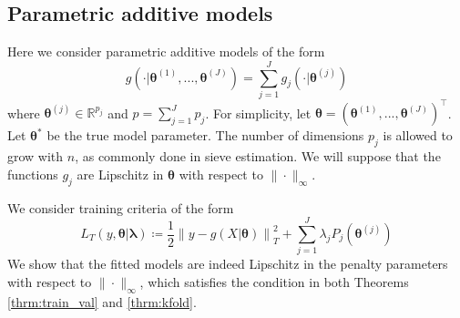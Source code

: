 \documentclass[12pt]{article}
\begin{document}
\subsection{Parametric additive models}
\label{sec:param_add_models}

Here we consider parametric additive models of the form
\begin{equation}
g(\cdot | \boldsymbol{\theta}^{(1)}, ..., \boldsymbol{\theta}^{(J)}) = \sum_{j=1}^J g_j(\cdot | \boldsymbol{\theta}^{(j)})
\end{equation}
where $\boldsymbol{\theta}^{(j)} \in \mathbb{R}^{p_j}$ and $p = \sum_{j=1}^J p_j$. For simplicity, let $\boldsymbol{\theta} = \left (\boldsymbol{\theta}^{(1)}, ..., \boldsymbol{\theta}^{(J)} \right )^\top$. Let $\boldsymbol{\theta}^*$ be the true model parameter. The number of dimensions $p_j$ is allowed to grow with $n$, as commonly done in sieve estimation. We will suppose that the functions $g_j$ are Lipschitz in $\boldsymbol{\theta}$ with respect to $\| \cdot \|_\infty$.

We consider training criteria of the form
\begin{equation}
\label{eq:param_add}
L_T \left (y, \boldsymbol{\theta} | \boldsymbol{\lambda} \right) 
\coloneqq \frac{1}{2} \left  \| y -  g(X| \boldsymbol{\theta}) \right \|^2_T 
+ \sum_{j=1}^J \lambda_j P_j(\boldsymbol{\theta}^{(j)})
\end{equation}
We show that the fitted models are indeed Lipschitz in the penalty parameters with respect to $\| \cdot \|_\infty$, which satisfies the condition in both Theorems \ref{thrm:train_val} and \ref{thrm:kfold}.

\end{document}
